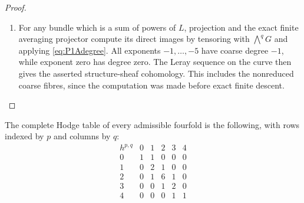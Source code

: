 \begin{proof}
\begin{enumerate}[label={$\langle1\rangle$\arabic*.}]
\item For any bundle which is a sum of powers of $L$, projection and
the exact finite averaging projector compute its direct images
by tensoring with $\bigwedge^qG$ and applying
\eqref{eq:P1Adegree}. All exponents $-1,\ldots,-5$ have coarse
degree $-1$, while exponent zero has degree zero. The Leray
sequence on the curve then gives the asserted structure-sheaf
cohomology. This includes the nonreduced coarse fibres, since
the computation was made before exact finite descent.

\end{enumerate}
\end{proof}




\begin{theorem}\hypertarget{tag-02R2}{}\label{night:P1A.2}
The complete Hodge table of every admissible fourfold is the
following, with rows indexed by $p$ and columns by $q$:
\[
\begin{array}{c|ccccc}
h^{p,q}&0&1&2&3&4\\\hline
0&1&1&0&0&0\\
1&0&2&1&0&0\\
2&0&1&6&1&0\\
3&0&0&1&2&0\\
4&0&0&0&1&1
\end{array}
\]
\end{theorem}
